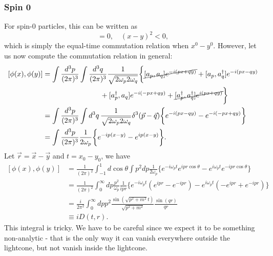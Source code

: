 \documentclass[11pt]{article}
\theoremstyle{definition}
\begin{document}
\subsubsection{Spin 0}
For spin-0 particles, this can be written as
\begin{equation}
    [\phi(x),\phi(y)] = 0, \quad (x-y)^2 < 0,
\end{equation}
which is simply the equal-time commutation relation when $x^0-y^0$. However, let us now compute the commutation relation in general:
\begin{equation}
\begin{aligned}
\left[\phi(x), \phi(y) \right] &= \int \frac{d^3p}{(2\pi)^3} \int \frac{d^3q}{(2\pi)^3} \frac{1}{\sqrt{2\omega_p 2\omega_q}} \biggl\{ \cancel{[a_p, a_q]e^{-i(px+qy)}} + [a_p, a_q^\dagger]e^{-i(px-qy)} \\
&\qquad \qquad \qquad \qquad + [a_p^\dagger, a_q]e^{-i(-px+qy)} + \cancel{[a_p^\dagger, a_q^\dagger]e^{i(px+qy)}} \biggr\} \\
&= \int \frac{d^3p}{(2\pi)^3} \int d^3q \, \frac{1}{\sqrt{2\omega_p 2\omega_q}}\delta^3(\vec{p}-\vec{q}) \biggl\{ e^{-i(px-qy)} - e^{-i(-px+qy)} \biggr\}\\
&= \int \frac{d^3p}{(2\pi)^3}\frac{1}{2\omega_p} \biggl\{ e^{-ip(x-y)} - e^{ip(x-y)} \biggr\}.
\end{aligned}
\end{equation}
Let $\vec{r} = \vec{x}-\vec{y}$ and $t = x_0-y_0$, we have
\begin{equation}
    \begin{aligned}
        \left[\phi(x), \phi(y) \right] &= \frac{1}{(2\pi)^2}\int ^1_{-1}d\cos\theta \int p^2dp\frac{1}{2\omega_p}\biggl\{e^{-i\omega_pt}e^{ipr\cos \theta} -e^{i\omega_pt}e^{-ipr\cos \theta}  \biggr\} \\
        &=\frac{1}{(2\pi)^2}\int^\infty_0dp\frac{p^2}{\omega_p} \frac{1}{ipr}\biggl\{e^{-i\omega_pt}(e^{ipr}- e^{-ipr}) -e^{i\omega_pt}(-e^{ipr}+ e^{-ipr})  \biggr\} \\
        &= \frac{i}{2\pi^2}\int^\infty_0dp p^2\frac{\sin(\sqrt{p^2+m^2}t)}{\sqrt{p^2+m^2}}\frac{\sin(qr)}{qr}\\
        &\equiv iD(t,r).
    \end{aligned}
\end{equation}
This integral is tricky. We have to be careful since we expect it to be something non-analytic - that is the only way it can vanish everywhere outside the lightcone, but not vanish inside the lightcone.
\end{document}
